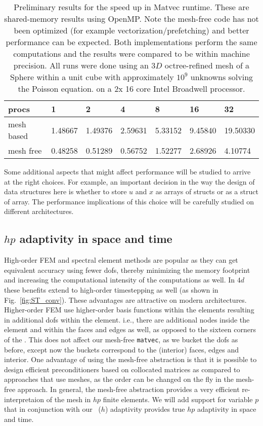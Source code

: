 \begin{table}
	\centering
	\begin{tabular}{|l|l|l|l|l|l|l|}
		\hline
		procs & 1 & 2 & 4 & 8 & 16 & 32 \\
		\hline
		mesh based & 1.48667 & 1.49376 & 2.59631 & 5.33152 &  9.45840 &  19.50330 \\
		\hline
		mesh free & 0.48258 &  0.51289  & 0.56752 &  1.52277 &  2.68926 &  4.10774 \\
		\hline
	\end{tabular}
	\caption{\label{tab:results} \small Preliminary results for the speed up in Matvec runtime. These are shared-memory results using OpenMP. Note the mesh-free code has not been optimized (for example vectorization/prefetching) and better performance can be expected. Both implementations perform the same computations and the results were compared to be within machine precision. All runs were done using an $3D$ octree-refined mesh of a Sphere within a unit cube with approximately $10^9$ unknowns solving the Poisson equation. on a 2x 16 core Intel Broadwell processor. }
\end{table}

Some additional aspects that might affect performance will be studied to arrive at the right choices. For example, an important decision in the way the design of data structures here is whether to store $u$ and $x$ as arrays of structs or as a struct of array. The performance implications of this choice will be carefully studied on different architectures. 

\subsection{$hp$ adaptivity in space and time}
\label{s:high-order}

High-order FEM and spectral element methods are popular as they can get equivalent accuracy using fewer dofs, thereby minimizing the memory footprint and increasing the computational intensity of the computations as well. In $4d$ these benefits extend to high-order timestepping as well (as shown in Fig.~\ref{fig:ST_conv}). These advantages are attractive on modern architectures. Higher-order FEM use higher-order basis functions within the elements resulting in additional dofs within the element. i.e., there are additional nodes inside the element and within the faces and edges as well, as opposed to the sixteen corners of the \stra. 
This does not affect our mesh-free \texttt{matvec}, as we bucket the dofs as before, except now the buckets correspond to the (interior) faces, edges and interior. One advantage of using the mesh-free abstraction is that it is possible to design efficient preconditioners based on collocated matrices \cite{sundar2015comparison} as compared to approaches that use meshes, as the order can be changed on the fly in the mesh-free approach. In general, the mesh-free abstraction provides a very efficient re-interpretaion of the mesh in $hp$ finite elements. We will add support for variable $p$ that in conjunction with our \stri\ ($h$) adaptivity provides true $hp$ adaptivity in space and time. 

